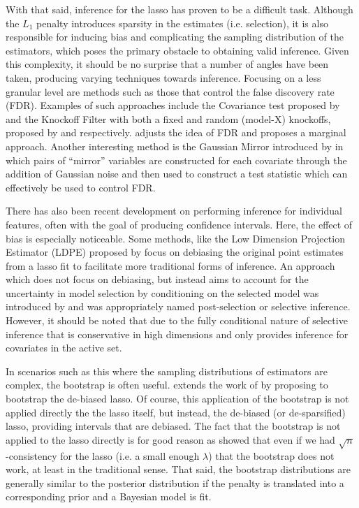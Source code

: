 With that said, inference for the lasso has proven to be a difficult task. Although the $L_1$ penalty introduces sparsity in the estimates (i.e. selection), it is also responsible for inducing bias and complicating the sampling distribution of the estimators, which poses the primary obstacle to obtaining valid inference. Given this complexity, it should be no surprise that a number of angles have been taken, producing varying techniques towards inference. Focusing on a less granular level are methods such as those that control the false discovery rate (FDR). Examples of such approaches include the Covariance test proposed by \cite{Lockhart2014} and the Knockoff Filter with both a fixed and random (model-X) knockoffs, proposed by \cite{Candes2015} and \cite{Candes2018} respectively. \cite{Breheny2019} adjusts the idea of FDR and proposes a marginal approach. Another interesting method is the Gaussian Mirror introduced by \cite{Xing2023} in which pairs of ``mirror'' variables are constructed for each covariate through the addition of Gaussian noise and then used to construct a test statistic which can effectively be used to control FDR.

There has also been recent development on performing inference for individual features, often with the goal of producing confidence intervals. Here, the effect of bias is especially noticeable. Some methods, like the Low Dimension Projection Estimator (LDPE) proposed by \cite{ZhangZhang2014} focus on debiasing the original point estimates from a lasso fit to facilitate more traditional forms of inference. An approach which does not focus on debiasing, but instead aims to account for the uncertainty in model selection by conditioning on the selected model was introduced by \cite{LeeEtAl2016} and was appropriately named post-selection or selective inference. However, it should be noted that due to the fully conditional nature of selective inference that is conservative in high dimensions and only provides inference for covariates in the active set.

In scenarios such as this where the sampling distributions of estimators are complex, the bootstrap is often useful. \cite{Dezeure2017} extends the work of \cite{ZhangZhang2014} by proposing to bootstrap the de-biased lasso. Of course, this application of the bootstrap is not applied directly the the lasso itself, but instead, the de-biased (or de-sparsified) lasso, providing intervals that are debiased. The fact that the bootstrap is not applied to the lasso directly is for good reason as \cite{Chatterjee2010} showed that even if we had $\sqrt{n}$-consistency for the lasso (i.e. a small enough $\lambda$) that the bootstrap does not work, at least in the traditional sense. That said, the bootstrap distributions are generally similar to the posterior distribution if the penalty is translated into a corresponding prior and a Bayesian model is fit.

